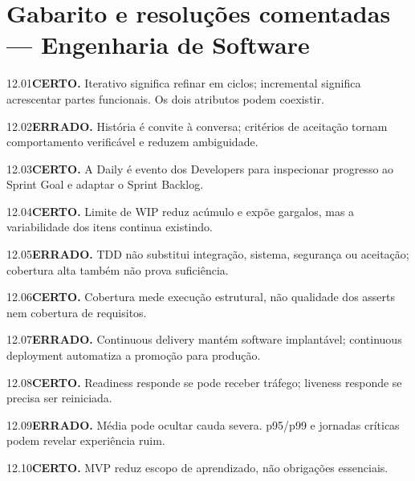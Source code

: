 \section{Gabarito e resoluções comentadas — Engenharia de Software}

\begin{solucao}{12.01}\textbf{CERTO.} Iterativo significa refinar em ciclos; incremental significa acrescentar partes funcionais. Os dois atributos podem coexistir.\end{solucao}
\begin{solucao}{12.02}\textbf{ERRADO.} História é convite à conversa; critérios de aceitação tornam comportamento verificável e reduzem ambiguidade.\end{solucao}
\begin{solucao}{12.03}\textbf{CERTO.} A Daily é evento dos Developers para inspecionar progresso ao Sprint Goal e adaptar o Sprint Backlog.\end{solucao}
\begin{solucao}{12.04}\textbf{CERTO.} Limite de WIP reduz acúmulo e expõe gargalos, mas a variabilidade dos itens continua existindo.\end{solucao}
\begin{solucao}{12.05}\textbf{ERRADO.} TDD não substitui integração, sistema, segurança ou aceitação; cobertura alta também não prova suficiência.\end{solucao}
\begin{solucao}{12.06}\textbf{CERTO.} Cobertura mede execução estrutural, não qualidade dos asserts nem cobertura de requisitos.\end{solucao}
\begin{solucao}{12.07}\textbf{ERRADO.} Continuous delivery mantém software implantável; continuous deployment automatiza a promoção para produção.\end{solucao}
\begin{solucao}{12.08}\textbf{CERTO.} Readiness responde se pode receber tráfego; liveness responde se precisa ser reiniciada.\end{solucao}
\begin{solucao}{12.09}\textbf{ERRADO.} Média pode ocultar cauda severa. p95/p99 e jornadas críticas podem revelar experiência ruim.\end{solucao}
\begin{solucao}{12.10}\textbf{CERTO.} MVP reduz escopo de aprendizado, não obrigações essenciais.\end{solucao}

